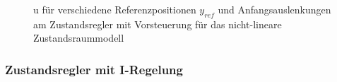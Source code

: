 \documentclass[
	pagesize,
	fontsize=12pt,
	paper=a4,
	oneside,
   reqno
]{scrartcl}
\begin{document}
\begin{figure}[H]
    \centering
    \caption[u für Regler mit Vorsteuerung (nicht-linear)]{u für verschiedene Referenzpositionen $y_{ref}$ und Anfangsauslenkungen am Zustandsregler mit Vorsteuerung für das nicht-lineare Zustandsraummodell}
    \label{fig:Bild26}
\end{figure}

\subsubsection{Zustandsregler mit I-Regelung}
\end{document}
